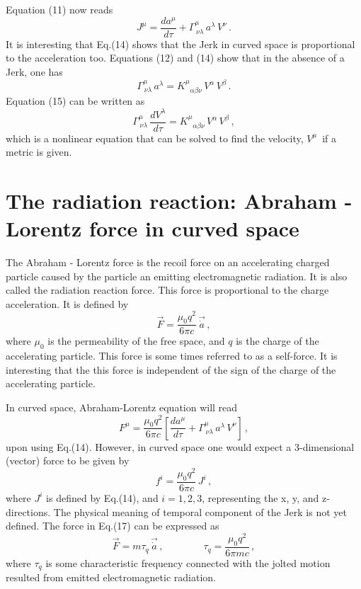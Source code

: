 \documentclass[a4]{epl2}
\begin{document}
Equation (11) now reads
\begin{equation}
J^\mu=\frac{da^\mu}{d\tau}+\Gamma ^\mu_{\,\nu\lambda}\, a^\lambda\,V^\nu\,.
\end{equation}
It is interesting that Eq.(14) shows that the Jerk in curved space is proportional to the acceleration too.
Equations (12) and (14) show that in the absence of a Jerk, one has
\begin{equation}
\Gamma ^\mu_{\,\nu\lambda}\, a^\lambda=K^\mu_{\,\,\,\,\alpha\beta\nu}\, V^\alpha\,V^\beta\,.
\end{equation}
Equation (15) can be written as
\begin{equation}
\Gamma ^\mu_{\,\nu\lambda}\, \frac{dV^\lambda}{d\tau}=K^\mu_{\,\,\,\,\alpha\beta\nu}\, V^\alpha\,V^\beta\,,
\end{equation}
which is a nonlinear equation that can be solved to find the velocity, $V^\mu$\, if a metric is given.

\section{\textcolor[rgb]{0.00,0.07,1.00}{The radiation reaction: Abraham - Lorentz force in curved space}}

The Abraham - Lorentz force  is the recoil force on an accelerating charged particle caused by the particle an emitting electromagnetic radiation. It is also called the radiation reaction force. This force is proportional to the charge acceleration. It is defined by \textcolor[rgb]{0.00,0.07,1.00}{\cite{abraham}}
\begin{equation}
\vec{F}=\frac{\mu_0 q^2}{6\pi c}\, \vec{\dot a}\,,
\end{equation}
where $\mu_0$ is the permeability of the free space, and $q$ is the charge of the accelerating particle. This force is some times referred to as a self-force. It is interesting that the this force is independent of the sign of the  charge of the accelerating particle.

In curved space, Abraham-Lorentz equation will read
\begin{equation}
F^\mu=\frac{\mu_0 q^2}{6\pi c}\left[\frac{da^\mu}{d\tau}+\Gamma ^\mu_{\,\nu\lambda}\, a^\lambda\,V^\nu\right]\,,
\end{equation}
upon using Eq.(14). However, in curved space one would expect a 3-dimensional (vector) force to be given by
\begin{equation}
f^i=\frac{\mu_0 q^2}{6\pi c}\, J^i\,,
\end{equation}
where $J^i$ is defined by Eq.(14), and $i=1, 2, 3$, representing the x, y, and z-directions. The physical meaning of temporal component of the Jerk is not yet defined. The  force in Eq.(17) can be expressed as
\begin{equation}
\vec{F}=m\tau_q\, \vec{\dot a}\,,\qquad\qquad \tau_q=\frac{\mu_0 q^2}{6\pi mc}\,,
\end{equation}
  where $\tau_q$ is some characteristic frequency connected with the jolted  motion resulted from emitted electromagnetic radiation.
\end{document}
